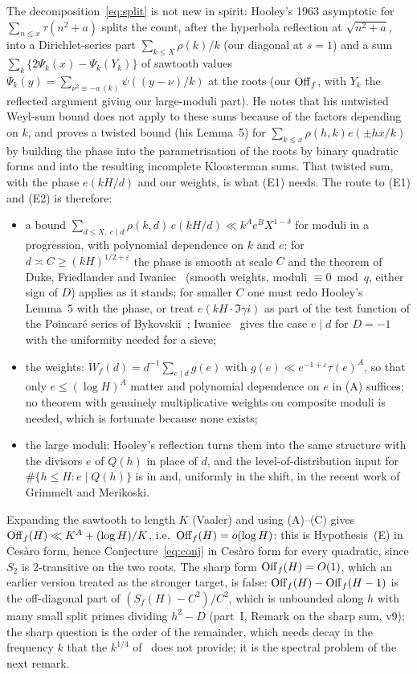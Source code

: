 \documentclass[11pt,a4paper]{article}
\theoremstyle{remark}\newtheorem{remark}[theorem]{Remark}
\begin{document}
The decomposition~\eqref{eq:split} is not new in spirit: Hooley's 1963 asymptotic for $\sum_{n\le x}\tau(n^2+a)$
\cite{Hooley1963} splits the count, after the hyperbola reflection at $\sqrt{n^2+a}$, into a Dirichlet-series
part $\sum_{k\le X}\rho(k)/k$ (our diagonal at $s=1$) and a sum $\sum_k\{2\Psi_k(x)-\Psi_k(Y_k)\}$ of sawtooth
values $\Psi_k(y)=\sum_{\nu^2\equiv-a\,(k)}\psi((y-\nu)/k)$ at the roots (our $\mathrm{Off}_f$, with $Y_k$ the reflected
argument giving our large-moduli part). He notes that his untwisted Weyl-sum bound does not apply to these
sums because of the factors depending on $k$, and proves a twisted bound (his Lemma~5) for
$\sum_{k\le x}\rho(h,k)e(\pm hx/k)$ by building the phase into the parametrisation of the roots by binary
quadratic forms and into the resulting incomplete Kloosterman sums. That twisted sum, with the phase $e(kH/d)$
and our weights, is what (E1) needs. The route to (E1) and (E2) is therefore:
\begin{itemize}
\item[(A)] a bound $\sum_{d\le X,\ e\mid d}\rho(k,d)\,e(kH/d)\ll k^{A}e^{B}X^{1-\delta}$ for moduli in a
progression, with polynomial dependence on $k$ and $e$: for $d\asymp C\ge(kH)^{1/2+\varepsilon}$ the phase is
smooth at scale $C$ and the theorem of Duke, Friedlander and Iwaniec~\cite{DFI2012} (smooth weights, moduli
$\equiv0\bmod q$, either sign of $D$) applies as it stands; for smaller $C$ one must redo Hooley's Lemma~5 with
the phase, or treat $e(kH\cdot\Im\gamma i)$ as part of the test function of the Poincar\'e series of
Bykovskii~\cite{Bykovskii1984}; Iwaniec~\cite{Iwaniec1978} gives the case $e\mid d$ for $D=-1$ with the
uniformity needed for a sieve;
\item[(B)] the weights: $W_f(d)=d^{-1}\sum_{e\mid d}g(e)$ with $g(e)\ll e^{-1+\varepsilon}\tau(e)^{A}$, so that only
$e\le(\log H)^{A}$ matter and polynomial dependence on $e$ in (A) suffices; no theorem with genuinely
multiplicative weights on composite moduli is needed, which is fortunate because none exists;
\item[(C)] the large moduli: Hooley's reflection turns them into the same structure with the divisors $e$ of
$Q(h)$ in place of $d$, and the level-of-distribution input for $\#\{h\le H:e\mid Q(h)\}$ is in
\cite{Iwaniec1978} and, uniformly in the shift, in the recent work of Grimmelt and Merikoski.
\end{itemize}
Expanding the sawtooth to length $K$ (Vaaler) and using (A)--(C) gives $\mathrm{Off}_f(H)\ll K^{A}+(\log H)/K$, i.e.\
$\mathrm{Off}_f(H)=o(\log H)$: this is Hypothesis~(E) in Ces\`aro form, hence Conjecture~\eqref{eq:conj} in Ces\`aro form
for every quadratic, since $S_2$ is $2$-transitive on the two roots. The sharp form $\mathrm{Off}_f(H)=O(1)$, which an
earlier version treated as the stronger target, is false: $\mathrm{Off}_f(H)-\mathrm{Off}_f(H-1)$ is the off-diagonal part of
$(S_f(H)-C^2)/C^2$, which is unbounded along $h$ with many small split primes dividing $h^2-D$ (part~I, Remark on the sharp
sum, v9); the sharp question is the order of the remainder, which needs decay
in the frequency $k$ that the $k^{1/4}$ of~\cite{DFI2012} does not provide; it is the spectral problem of the next
remark.
\end{document}
